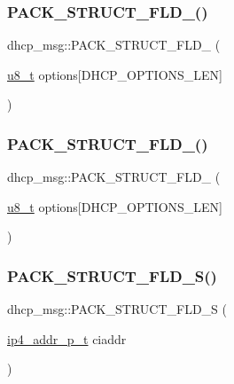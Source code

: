 \subsubsection{\texorpdfstring{P\+A\+C\+K\+\_\+\+S\+T\+R\+U\+C\+T\+\_\+\+F\+L\+D\+\_()}{PACK\_STRUCT\_FLD\_8()}\hspace{0.1cm}{\footnotesize\ttfamily [15/16]}}
{\footnotesize\ttfamily dhcp\+\_\+msg\+::\+P\+A\+C\+K\+\_\+\+S\+T\+R\+U\+C\+T\+\_\+\+F\+L\+D\+\_ (\begin{DoxyParamCaption}\item[{\hyperlink{group__compiler__abstraction_ga4caecabca98b43919dd11be1c0d4cd8e}{u8\+\_\+t}}]{options\mbox{[}\+D\+H\+C\+P\+\_\+\+O\+P\+T\+I\+O\+N\+S\+\_\+\+L\+E\+N\mbox{]} }\end{DoxyParamCaption})}

\mbox{\label{structdhcp__msg_a5c611e9424152b509cf171af66362d66}} 
\subsubsection{\texorpdfstring{P\+A\+C\+K\+\_\+\+S\+T\+R\+U\+C\+T\+\_\+\+F\+L\+D\+\_()}{PACK\_STRUCT\_FLD\_8()}\hspace{0.1cm}{\footnotesize\ttfamily [16/16]}}
{\footnotesize\ttfamily dhcp\+\_\+msg\+::\+P\+A\+C\+K\+\_\+\+S\+T\+R\+U\+C\+T\+\_\+\+F\+L\+D\+\_ (\begin{DoxyParamCaption}\item[{\hyperlink{group__compiler__abstraction_ga4caecabca98b43919dd11be1c0d4cd8e}{u8\+\_\+t}}]{options\mbox{[}\+D\+H\+C\+P\+\_\+\+O\+P\+T\+I\+O\+N\+S\+\_\+\+L\+E\+N\mbox{]} }\end{DoxyParamCaption})}

\mbox{\label{structdhcp__msg_a1b1e3b64cb761605e306dff17be06b5e}} 
\subsubsection{\texorpdfstring{P\+A\+C\+K\+\_\+\+S\+T\+R\+U\+C\+T\+\_\+\+F\+L\+D\+\_\+\+S()}{PACK\_STRUCT\_FLD\_S()}\hspace{0.1cm}{\footnotesize\ttfamily [1/8]}}
{\footnotesize\ttfamily dhcp\+\_\+msg\+::\+P\+A\+C\+K\+\_\+\+S\+T\+R\+U\+C\+T\+\_\+\+F\+L\+D\+\_\+S (\begin{DoxyParamCaption}\item[{\hyperlink{native_2lwip_2src_2include_2lwip_2prot_2ip4_8h_ae5011654fcbadf6b6582b8d49446107f}{ip4\+\_\+addr\+\_\+p\+\_\+t}}]{ciaddr }\end{DoxyParamCaption})}

